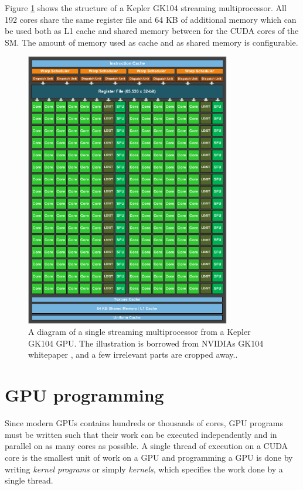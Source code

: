 Figure \ref{fig:kepler_sm} shows the structure of a Kepler GK104
streaming multiprocessor. All 192 cores share the same register file
and 64 KB of additional memory which can be used both as L1 cache and
shared memory between for the CUDA cores of the SM. The amount of
memory used as cache and as shared memory is configurable.

\begin{figure}
  \centering
  \includegraphics[width=0.8\textwidth]{graphics/nvidia_kepler_gk104_sm_cropped}
  \vspace{2mm}
  \caption{A diagram of a single streaming multiprocessor from a
    Kepler GK104 GPU. The illustration is borrowed from NVIDIAs GK104
    whitepaper \cite{nvidia2012geforcegtx680}, and a few irrelevant
    parts are cropped away..}
  \label{fig:kepler_sm}
\end{figure}

\section{GPU programming}
Since modern GPUs contains hundreds or thousands of cores, GPU
programs must be written such that their work can be executed
independently and in parallel on as many cores as possible. A single
thread of execution on a CUDA core is the smallest unit of work on a
GPU and programming a GPU is done by writing \textit{kernel programs}
or simply \textit{kernels}, which specifies the work done by a single
thread.

